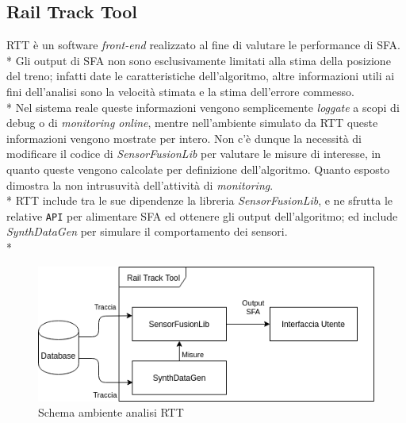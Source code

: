 \subsection{Rail Track Tool}
RTT \`e un software \emph{front-end} realizzato al fine di valutare le performance di SFA.\\*
Gli output di SFA non sono esclusivamente limitati alla stima della posizione del treno; infatti date le caratteristiche dell'algoritmo, altre informazioni utili ai fini dell'analisi sono la velocit\`a stimata e la stima dell'errore commesso.\\*
Nel sistema reale queste informazioni vengono semplicemente \emph{loggate} a scopi di debug o di \emph{monitoring online}, mentre nell'ambiente simulato da RTT queste informazioni vengono mostrate per intero. Non c'\`e dunque la necessit\`a di modificare il codice di \emph{SensorFusionLib} per valutare le misure di interesse, in quanto queste vengono calcolate per definizione dell'algoritmo. Quanto esposto dimostra la non intrusuvit\`a dell'attivit\`a di \emph{monitoring}.\\*
RTT include tra le sue dipendenze la libreria \emph{SensorFusionLib}, e ne sfrutta le relative \texttt{API} per alimentare SFA ed ottenere gli output dell'algoritmo; ed include \emph{SynthDataGen} per simulare il comportamento dei sensori.\\*
\begin{figure}[h]
	\centering
	\includegraphics[width=0.7\linewidth]{img/RTTSchemaFull}
	\caption{Schema ambiente analisi RTT}
	\label{fig:rttfull}
\end{figure}
